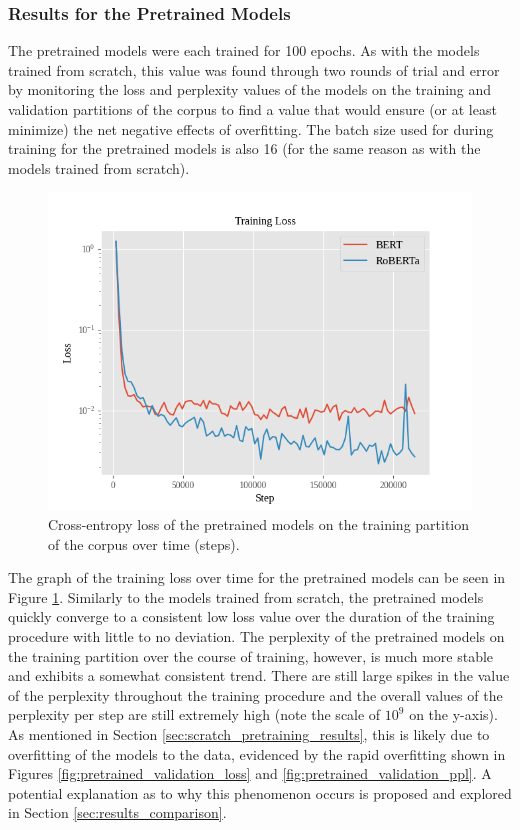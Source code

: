 \documentclass[12pt]{article}
\begin{document}
\subsubsection{Results for the Pretrained Models}\label{sec:pretrained_pretraining_results}
The pretrained models were each trained for 100 epochs. As with the models trained from scratch, this value was found through two rounds of trial and
error by monitoring the loss and perplexity values of the models on the training and validation partitions of the corpus to find a value that would
ensure (or at least minimize) the net negative effects of overfitting. The batch size used for during training for the pretrained models is also 16
(for the same reason as with the models trained from scratch).

\begin{figure}[!t]
    \includegraphics[width=\linewidth]{figures/pretrained_training_loss.png}
    \caption{Cross-entropy loss of the pretrained models on the training partition of the corpus over time (steps).}
    \label{fig:pretrained_training_loss}
\end{figure}

The graph of the training loss over time for the pretrained models can be seen in Figure \ref{fig:pretrained_training_loss}. Similarly to the models
trained from scratch, the pretrained models quickly converge to a consistent low loss value over the duration of the training procedure with little
to no deviation. The perplexity of the pretrained models on the training partition over the course of training, however, is much more stable and
exhibits a somewhat consistent trend. There are still large spikes in the value of the perplexity throughout the training procedure and the overall
values of the perplexity per step are still extremely high (note the scale of $10^9$ on the y-axis). As mentioned in Section
\ref{sec:scratch_pretraining_results}, this is likely due to overfitting of the models to the data, evidenced by the rapid overfitting shown in
Figures \ref{fig:pretrained_validation_loss} and \ref{fig:pretrained_validation_ppl}. A potential explanation as to why this phenomenon occurs is
proposed and explored in Section \ref{sec:results_comparison}.
\end{document}
